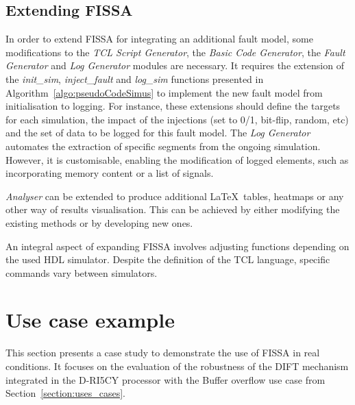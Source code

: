 \subsection{Extending FISSA}

In order to extend FISSA for integrating an additional fault model, some modifications to the \textit{TCL Script Generator}, the \textit{Basic Code Generator}, the \textit{Fault Generator} and \textit{Log Generator} modules are necessary. 
It requires the extension of the \textit{init\_sim}, \textit{inject\_fault} and \textit{log\_sim} functions presented in Algorithm~\ref{algo:pseudoCodeSimus} to implement the new fault model from initialisation to logging. 
For instance, these extensions should define the targets for each simulation, the impact of the injections (set to 0/1, bit-flip, random, etc) and the set of data to be logged for this fault model.
The \textit{Log Generator} automates the extraction of specific segments from the ongoing simulation. However, it is customisable, enabling the modification of logged elements, such as incorporating memory content or a list of signals.

\textit{Analyser} can be extended to produce additional \LaTeX~tables, heatmaps or any other way of results visualisation. This can be achieved by either modifying the existing methods or by developing new ones.

An integral aspect of expanding FISSA involves adjusting functions depending on the used HDL simulator. Despite the definition of the TCL language, specific commands vary between simulators. %

\section{Use case example}
\label{section:exampleApplication_fissa}
This section presents a case study to demonstrate the use of FISSA in real conditions. It focuses on the evaluation of the robustness of the DIFT mechanism integrated in the D-RI5CY processor with the Buffer overflow use case from Section~\ref{section:uses_cases}.

